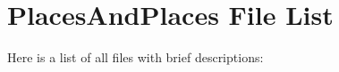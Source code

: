 \section{Places\-And\-Places File List}
Here is a list of all files with brief descriptions:\begin{CompactList}
\item{}
\end{CompactList}
